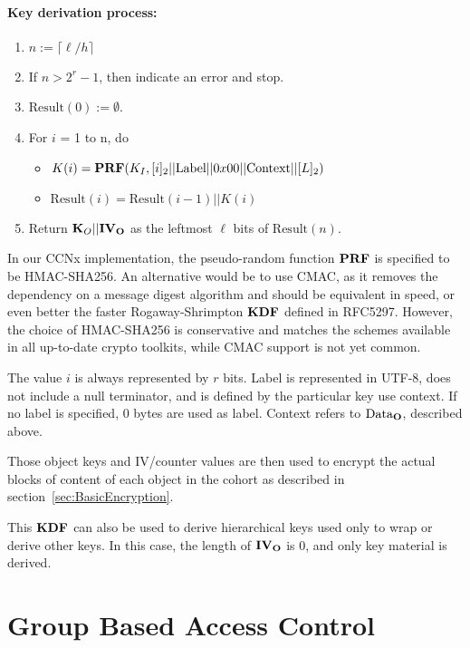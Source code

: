 \paragraph{Key derivation process:}
\begin{enumerate}
\item $n := \lceil \ell/h \rceil$
\item If $n > 2^{r}-1$, then indicate an error and stop.
\item $\mbox{Result}(0) := \emptyset$.
\item For $i$ = 1 to n, do
  \begin{itemize}
  \item $K(i) = {\textbf{PRF}}(K_I, [i]_2 || \mbox{Label} || 0x00 || \mbox{Context} || [L]_2)$
  \item $\mbox{Result}(i) = \mbox{Result}(i-1) || K(i)$
  \end{itemize}
\item Return ${\textbf{K}_O} || {\textbf{IV}}_{{\textbf{O}}}$ as the leftmost $\ell$ bits of $\mbox{Result}(n)$. 
\end{enumerate}

In our CCNx implementation, the pseudo-random function ${\textbf{PRF}}$ is
specified to be HMAC-SHA256. An alternative would be to use CMAC, as
it removes the dependency on a message digest algorithm and should be
equivalent in speed, or even better the faster Rogaway-Shrimpton
${\textbf{KDF}}$ defined in RFC5297. However, the choice of HMAC-SHA256 is
conservative and matches the schemes available in all up-to-date
crypto toolkits, while CMAC support is not yet common.

The value $i$ is always represented by $r$ bits. Label is represented
in UTF-8, does not include a null terminator, and is defined by the
particular key use context. If no label is specified, 0 bytes are used
as label. Context refers to $\mbox{Data}_{{\textbf{O}}}$, described above.

Those object keys and IV/counter values are then used to encrypt the
actual blocks of content of each object in the cohort as described in
section~\ref{sec:BasicEncryption}.

This ${\textbf{KDF}}$ can also be used to derive hierarchical keys used only to
wrap or derive other keys. In this case, the length of ${\textbf{IV}}_{{\textbf{O}}}$ is
0, and only key material is derived.

\newpage


\section{Group Based Access Control}
\label{sec:GroupBasedAccessControl}

